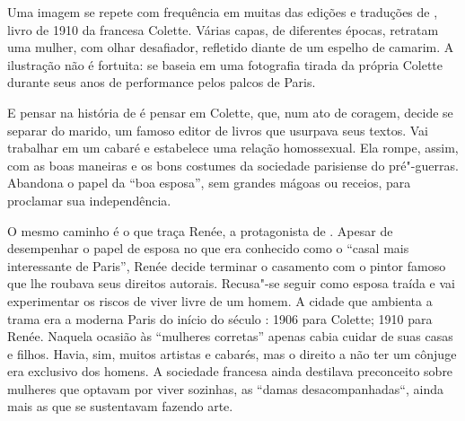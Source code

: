 \vfill

\hspace*{-.4cm}\begin{minipage}[c]{.5\linewidth}
\small{
{}}
\end{minipage}

\pagebreak 

\vspace*{1.5cm}


\bigskip

\hfill{}

\bigskip
\bigskip
\bigskip

Uma imagem se repete com frequência em muitas das edições e traduções de {}, livro de 1910 da francesa Colette. Várias capas, de diferentes épocas, retratam uma mulher, com olhar desafiador, refletido diante de um espelho de camarim. A ilustração não é fortuita: se baseia em uma fotografia tirada da própria Colette durante seus anos de performance pelos palcos de Paris. 

E pensar na história de {} é pensar em Colette, que, num ato de coragem, decide se separar do marido, um famoso editor de livros que usurpava seus textos. Vai trabalhar em um cabaré e estabelece uma relação homossexual. Ela rompe, assim, com as boas maneiras e os bons costumes da sociedade parisiense do pré"-guerras. Abandona o papel da “boa esposa”, sem grandes mágoas ou receios, para proclamar sua independência.

O mesmo caminho é o que traça Renée, a protagonista de {}. Apesar de desempenhar o papel de esposa no que era conhecido como o “casal mais interessante de Paris”, Renée decide terminar o casamento com o pintor famoso que lhe roubava seus direitos autorais. Recusa"-se seguir como esposa traída e vai experimentar os riscos de viver livre de um homem. A cidade que ambienta a trama era a moderna Paris do início do século : 1906 para Colette; 1910 para Renée. Naquela ocasião às “mulheres corretas” apenas cabia cuidar de suas casas e filhos. Havia, sim, muitos artistas e cabarés, mas o direito a não ter um cônjuge era exclusivo dos homens. A sociedade francesa ainda destilava preconceito sobre mulheres que optavam por viver sozinhas, as “damas desacompanhadas“, ainda mais as que se sustentavam fazendo arte.

